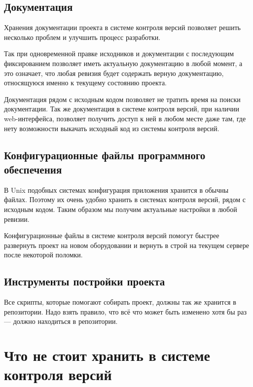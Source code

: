 \subsection{ Документация } \label{sect3_5_1}

Хранения документации проекта в системе контроля версий позволяет решить несколько проблем и улучшить процесс разработки.

Так при одновременной правке исходников и документации с последующим фиксированием позволяет иметь актуальную документацию в любой момент, а это означает, что любая ревизия будет содержать верную документацию, относящуюся именно к текущему состоянию проекта.

Документация рядом с исходным кодом позволяет не тратить время на поиски документации. Так же документация в системе контроля версий, при наличии web-интерфейса, позволяет получить доступ к ней в любом месте даже там, где нету возможности выкачать исходный код из системы контроля версий.

\subsection{ Конфигурационные файлы программного обеспечения } \label{sect3_5_2}


В Unix подобных системах конфигурация приложения хранится в обычны файлах. Поэтому их очень удобно хранить в системах контроля версий, рядом с исходным кодом. Таким образом мы получим актуальные настройки  в любой ревизии.

Конфигурационные файлы в системе контроля версий помогут быстрее развернуть проект на новом оборудовании и вернуть в строй на текущем сервере после некоторой поломки.

\subsection{ Инструменты постройки проекта } \label{sect3_5_3}

Все скрипты, которые помогают собирать проект, должны так же хранится в репозитории. Надо взять правило, что всё что может быть изменено хотя бы раз --- должно находиться в репозитории.

\section{ Что не стоит хранить в системе контроля версий } \label{sect3_6}

